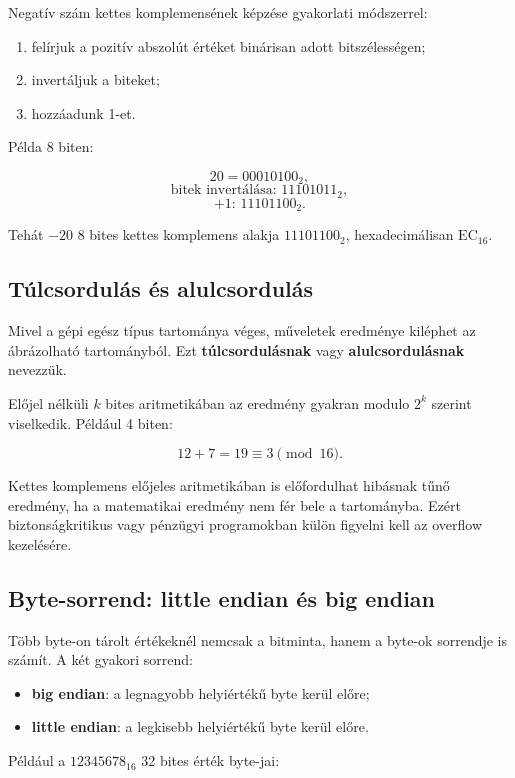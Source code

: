 Negatív szám kettes komplemensének képzése gyakorlati módszerrel:

\begin{enumerate}
  \item felírjuk a pozitív abszolút értéket binárisan adott bitszélességen;
  \item invertáljuk a biteket;
  \item hozzáadunk 1-et.
\end{enumerate}

Példa 8 biten:

\[
20=00010100_2,
\]
\[
\text{bitek invertálása: }11101011_2,
\]
\[
\text{+1: }11101100_2.
\]

Tehát $-20$ 8 bites kettes komplemens alakja $11101100_2$, hexadecimálisan $\mathrm{EC}_{16}$.

\subsection{Túlcsordulás és alulcsordulás}

Mivel a gépi egész típus tartománya véges, műveletek eredménye kiléphet az ábrázolható tartományból. Ezt \textbf{túlcsordulásnak} vagy \textbf{alulcsordulásnak} nevezzük.

Előjel nélküli $k$ bites aritmetikában az eredmény gyakran modulo $2^k$ szerint viselkedik. Például 4 biten:

\[
12+7=19\equiv3\pmod{16}.
\]

Kettes komplemens előjeles aritmetikában is előfordulhat hibásnak tűnő eredmény, ha a matematikai eredmény nem fér bele a tartományba. Ezért biztonságkritikus vagy pénzügyi programokban külön figyelni kell az overflow kezelésére.

\subsection{Byte-sorrend: little endian és big endian}

Több byte-on tárolt értékeknél nemcsak a bitminta, hanem a byte-ok sorrendje is számít. A két gyakori sorrend:

\begin{itemize}
  \item \textbf{big endian}: a legnagyobb helyiértékű byte kerül előre;
  \item \textbf{little endian}: a legkisebb helyiértékű byte kerül előre.
\end{itemize}

Például a $\mathrm{12345678}_{16}$ 32 bites érték byte-jai:

